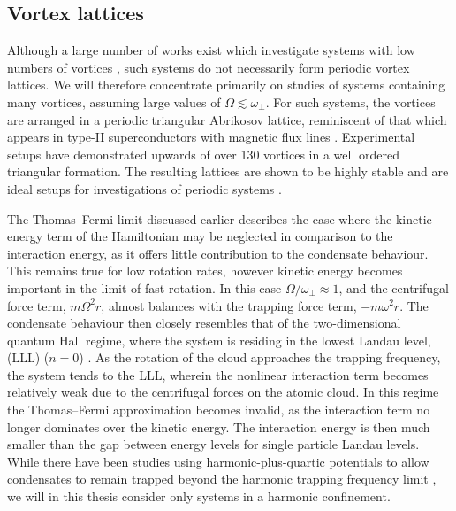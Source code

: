 \subsection{Vortex lattices}\label{sec:sec2_vtxlatt}

Although a large number of works exist which investigate systems with low numbers of vortices \cite{THS:Davies_2000,Vtx:Chevy_prl_2000,Vtx:Cooper_prl_2001,Vtx:Rosenbusch_prl_2002,Vtx:Ogawa_pra_2002,Vtx:Bretin_joptb_2003,Vtx:Madison_prl_2000,Vtx:Madison_jmo_2000,Vtx:Chevy_aoi_2001,Vtx:Madison_prl_2001,Vtx:Mottonen_jpcm_2002}, such systems do not necessarily form periodic vortex lattices. We will therefore concentrate primarily on studies of systems containing many vortices, assuming large values of $\Omega \lesssim \omega_\perp$. For such systems, the vortices are arranged in a periodic triangular Abrikosov lattice, reminiscent of that which appears in type-II superconductors with magnetic flux lines \cite{Vtx:AboShaeer_sci_2001}. Experimental setups have demonstrated upwards of over 130 vortices in a well ordered triangular formation. The resulting lattices are shown to be highly stable and are ideal setups for investigations of periodic systems \cite{Vtx:AboShaeer_sci_2001,Vtx:Engels_prl_2002}.

The Thomas--Fermi limit discussed earlier describes the case where the kinetic energy term of the Hamiltonian may be neglected in comparison to the interaction energy, as it offers little contribution to the condensate behaviour. This remains true for low rotation rates, however kinetic energy becomes important in the limit of fast rotation. In this case $\Omega/\omega_{\perp}\approx 1$, and the centrifugal force term, $m\Omega^2r$, almost balances with the trapping force term, $-m\omega^2r$. The condensate behaviour then closely resembles that of the two-dimensional quantum Hall regime, where the system is residing in the lowest Landau level, (LLL) ($n=0$) \cite{Vtx:Ho_prl_2001}.  As the rotation of the cloud approaches the trapping frequency, the system tends to the LLL, wherein the nonlinear interaction term becomes relatively weak due to the centrifugal forces on the atomic cloud. In this regime the Thomas--Fermi approximation becomes invalid, as the interaction term no longer dominates over the kinetic energy. The interaction energy is then much smaller than the gap between energy levels for single particle Landau levels. While there have been studies using harmonic-plus-quartic potentials to allow condensates to remain trapped beyond the harmonic trapping frequency limit \cite{BEC:Bretin_prl_2004,Vtx:Ghosh_pra_2004}, we will in this thesis consider only systems in a harmonic confinement.

